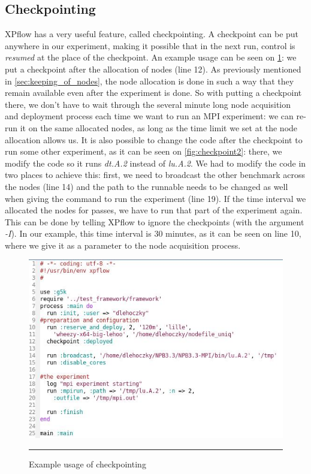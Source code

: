 \subsection{Checkpointing}
XPflow has a very useful feature, called checkpointing. A checkpoint
can be put anywhere in our experiment, making it possible that in the
next run, control is \emph{resumed} at the place of the checkpoint. An
example usage can be seen on \ref{fig:checkpoint1}: we put a
checkpoint after the allocation of nodes (line 12). As previously
mentioned in \ref{sec:keeping_of_nodes}, the node allocation is done
in such a way that they remain available even after the experiment is
done. So with putting a checkpoint there, we don't have to wait
through the several minute long node acquisition and deployment
process each time we want to run an MPI experiment: we can re-run it
on the same allocated nodes, as long as the time limit we set at the
node allocation allows us. It is also possible to change the code
after the checkpoint to run some other experiment, as it can be seen
on \ref{fig:checkpoint2}: there, we modify the code so it runs
\emph{dt.A.2} instead of \emph{lu.A.2}. We had to modify the code in
two places to achieve this: first, we need to broadcast the other
benchmark across the nodes (line 14) and the path to the runnable
needs to be changed as well when giving the command to run the
experiment (line 19). If the time interval we allocated the nodes for
passes, we have to run that part of the experiment again. This can be
done by telling XPflow to ignore the checkpoints (with the argument
\emph{-I}). In our example, this time interval is 30 minutes, as it
can be seen on line 10, where we give it as a parameter to the node
acquisition process.
\begin{figure}[htbp]
  \centering
    \includegraphics[scale=0.7]{./Figures/checkpoint1.jpg}
    \rule{35em}{0.5pt}
  \caption[Checkpoint example]{Example usage of checkpointing}
  \label{fig:checkpoint1}
\end{figure}
